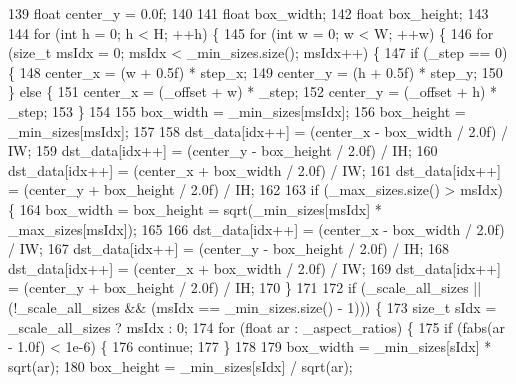 \begin{DoxyCode}
139         \textcolor{keywordtype}{float} center\_y = 0.0f;
140 
141         \textcolor{keywordtype}{float} box\_width;
142         \textcolor{keywordtype}{float} box\_height;
143 
144         \textcolor{keywordflow}{for} (\textcolor{keywordtype}{int} h = 0; h < H; ++h) \{
145             \textcolor{keywordflow}{for} (\textcolor{keywordtype}{int} w = 0; w < W; ++w) \{
146                 \textcolor{keywordflow}{for} (\textcolor{keywordtype}{size\_t} msIdx = 0; msIdx < \_min\_sizes.size(); msIdx++) \{
147                     \textcolor{keywordflow}{if} (\_step == 0) \{
148                         center\_x = (w + 0.5f) * step\_x;
149                         center\_y = (h + 0.5f) * step\_y;
150                     \} \textcolor{keywordflow}{else} \{
151                         center\_x = (\_offset + w) * \_step;
152                         center\_y = (\_offset + h) * \_step;
153                     \}
154 
155                     box\_width = \_min\_sizes[msIdx];
156                     box\_height = \_min\_sizes[msIdx];
157 
158                     dst\_data[idx++] = (center\_x - box\_width / 2.0f) / IW;
159                     dst\_data[idx++] = (center\_y - box\_height / 2.0f) / IH;
160                     dst\_data[idx++] = (center\_x + box\_width / 2.0f) / IW;
161                     dst\_data[idx++] = (center\_y + box\_height / 2.0f) / IH;
162 
163                     \textcolor{keywordflow}{if} (\_max\_sizes.size() > msIdx) \{
164                         box\_width = box\_height = sqrt(\_min\_sizes[msIdx] * \_max\_sizes[msIdx]);
165 
166                         dst\_data[idx++] = (center\_x - box\_width / 2.0f) / IW;
167                         dst\_data[idx++] = (center\_y - box\_height / 2.0f) / IH;
168                         dst\_data[idx++] = (center\_x + box\_width / 2.0f) / IW;
169                         dst\_data[idx++] = (center\_y + box\_height / 2.0f) / IH;
170                     \}
171 
172                     \textcolor{keywordflow}{if} (\_scale\_all\_sizes || (!\_scale\_all\_sizes && (msIdx == \_min\_sizes.size() - 1))) \{
173                         \textcolor{keywordtype}{size\_t} sIdx = \_scale\_all\_sizes ? msIdx : 0;
174                         \textcolor{keywordflow}{for} (\textcolor{keywordtype}{float} ar : \_aspect\_ratios) \{
175                             \textcolor{keywordflow}{if} (fabs(ar - 1.0f) < 1e-6) \{
176                                 \textcolor{keywordflow}{continue};
177                             \}
178 
179                             box\_width = \_min\_sizes[sIdx] * sqrt(ar);
180                             box\_height = \_min\_sizes[sIdx] / sqrt(ar);

\end{DoxyCode}
